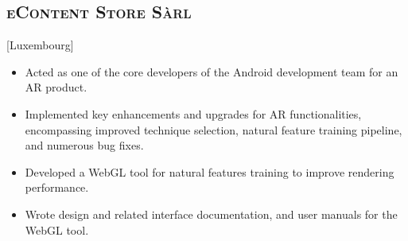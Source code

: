 \documentclass{mycv}
\begin{document}




\vspace{-\parskip}

\subsection{\large \scshape eContent Store S\`arl}[Luxembourg]

\begin{positions}
\end{positions}

\begin{itemize}
  \itemsep 0.3em
  \item Acted as one of the core developers of the Android development team for an AR product.
  \item Implemented key enhancements and upgrades for AR functionalities, encompassing improved technique selection, natural feature training pipeline, and numerous bug fixes.
  \item Developed a WebGL tool for natural features training to improve rendering performance.
  \item Wrote design and related interface documentation, and user manuals for the WebGL tool.
\end{itemize}


\vspace{-0.5em}
\end{document}
